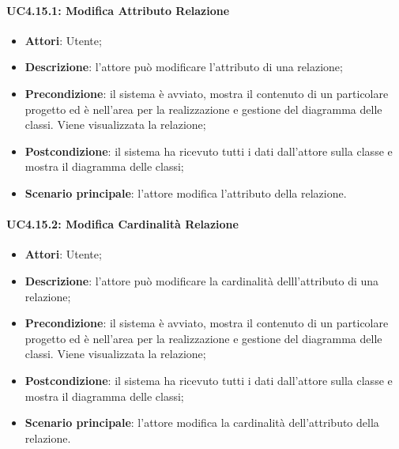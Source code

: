 \paragraph{UC4.15.1: Modifica Attributo Relazione}
\label{UC4.15.1}
\begin{itemize}
	\item \textbf{Attori}: Utente;
	\item \textbf{Descrizione}: l'attore può modificare l'attributo di una relazione;
	\item \textbf{Precondizione}: il sistema è avviato, mostra il contenuto di un particolare progetto ed è nell'area per la realizzazione e gestione del diagramma delle classi. Viene visualizzata la relazione;
	\item \textbf{Postcondizione}: il sistema ha ricevuto tutti i dati dall'attore sulla classe e mostra il diagramma delle classi;
	\item \textbf{Scenario principale}: l'attore modifica l'attributo della relazione.
\end{itemize}

\paragraph{UC4.15.2: Modifica Cardinalità Relazione}
\label{UC4.15.2}
\begin{itemize}
	\item \textbf{Attori}: Utente;
	\item \textbf{Descrizione}: l'attore può modificare la cardinalità delll'attributo di una relazione;
	\item \textbf{Precondizione}: il sistema è avviato, mostra il contenuto di un particolare progetto ed è nell'area per la realizzazione e gestione del diagramma delle classi. Viene visualizzata la relazione;
	\item \textbf{Postcondizione}: il sistema ha ricevuto tutti i dati dall'attore sulla classe e mostra il diagramma delle classi;
	\item \textbf{Scenario principale}: l'attore modifica la cardinalità dell'attributo della relazione.
\end{itemize}

